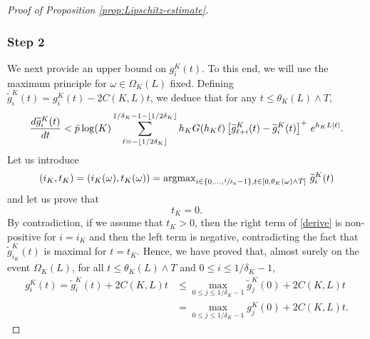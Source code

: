 \documentclass[JEP,XML,SOM,Unicode,published]{cedram}
\theoremstyle{plain}
\theoremstyle{remark}
\begin{document}
\begin{proof}[Proof of Proposition \ref{prop:Lipschitz-estimate}]
{\subsubsection*{Step 2} We next provide an upper bound on $g_i^K(t)$. To this end, we will
use the maximum principle for $\omega\in\Omega_K(L)$ fixed.
Defining $\widetilde g^K_{i}(t) = g^K_{i}(t) -2C(K,L) t$,
we deduce that for any $t\le \theta_{K}(L)\wedge T$,
\begin{equation}\label{derive}
{d \widetilde g^K_{i}(t)\over dt} < \bar p \log(K)
\sum_{\ell=-\lfloor 1/2\delta_K\rfloor}^{1/\delta_K-1-\lfloor 1/2\delta_K\rfloor}
h_{K} G(h_{K}\ell) \left[\widetilde g^K_{\ell+i}(t) - \widetilde g^K_{i}(t)\right]^+ \, e^{h_{K}L|\ell|}.
\end{equation}
Let us introduce
\[(i_{K}, t_{K}) = (i_K(\omega),t_K(\omega))=\text{argmax}_{{i\in \{0,\dots, \sfrac{1}{\delta_{K}}-1\}, t\in [0, \theta_{K}(\omega)\wedge T]}}\ \widetilde g^K_{i}(t)\]
and let us prove that \[t_{K}=0.\]
By contradiction, if we assume that $t_{K}>0$, then the right term of \eqref{derive} is non-positive for $i=i_{K}$ and then the
left term is negative, contradicting the fact that $\widetilde g^K_{i_K}(t)$ is maximal for $t=t_K$. Hence, we have proved that, almost surely on
the event $\Omega_K(L)$, for all $t\leq \theta_K(L)\wedge T$ and $0\leq i\leq 1/\delta_K-1$,
\begin{align*}
g^K_i(t)= \widetilde g^K_i(t)+2C(K,L) t
&\leq \max_{0\leq j\leq 1/\delta_K-1}\widetilde g^K _j(0)+2 C(K,L) t\\
&= \max_{0\leq j\leq 1/\delta_K-1} g^K _j(0)+2C(K,L) t.
\end{align*}

}
\end{proof}
\end{document}
